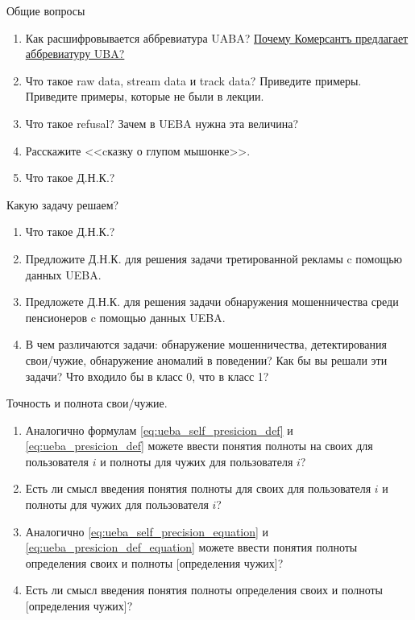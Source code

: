 \begin{frame}{Общие вопросы}
	\begin{enumerate}
		\item Как расшифровывается аббревиатура UABA? 
		\href{https://finance.rambler.ru/business/36508148-13-aprelya-v-moskve-id-kommersant-provedet-biznes-branch-user-behavior-analytics-uba-modnyy-trend-ili-novoe-effektivnoe-reshenie/}{Почему Комерсантъ предлагает аббревиатуру UBA?}
		\item Что такое raw data, stream data и track data? Приведите примеры. Приведите примеры, которые не были в лекции.
		\item Что такое refusal? Зачем в UEBA нужна эта величина?
		\item Расскажите <<cказку о глупом мышонке>>.
		\item Что такое Д.Н.К.?
	\end{enumerate}
\end{frame}

\begin{frame}{Какую задачу решаем?}
		\begin{enumerate}
		\item Что такое Д.Н.К.?
		\item Предложите Д.Н.К. для решения задачи третированной рекламы c помощью данных UEBA.
		\item Предложете Д.Н.К. для решения задачи обнаружения мошенничества среди пенсионеров c помощью данных UEBA.
		\item В чем различаются задачи: обнаружение мошенничества, детектирования свои/чужие, обнаружение аномалий в поведении? Как бы вы решали эти задачи? Что входило бы в класс 0, что в класс 1?
	\end{enumerate}
\end{frame}

\begin{frame}{Точность и полнота свои/чужие.}
\begin{enumerate}
	\item Аналогично формулам 
		\eqref{eq:ueba_self_presicion_def}
		и
		\eqref{eq:ueba_presicion_def}
		можете ввести понятия полноты на своих для пользователя $i$ и полноты для чужих
		для пользователя $i$?
	\item Есть ли смысл введения понятия полноты для своих для пользователя $i$ и полноты для чужих для пользователя $i$? 
	\item Аналогично \eqref{eq:ueba_self_precision_equation} 
		и \eqref{eq:ueba_presicion_def_equation}
		можете ввести понятия полноты определения своих и полноты [определения чужих]?
	\item Есть ли смысл введения понятия полноты определения своих и полноты [определения чужих]? 
\end{enumerate}
\end{frame}


